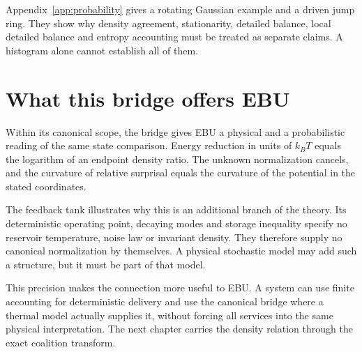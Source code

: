 Appendix~\ref{app:probability} gives a rotating Gaussian example and a driven jump ring. They show why density agreement, stationarity, detailed balance, local detailed balance and entropy accounting must be treated as separate claims. A histogram alone cannot establish all of them.

\section{What this bridge offers EBU}
Within its canonical scope, the bridge gives EBU a physical and a probabilistic reading of the same state comparison. Energy reduction in units of $k_BT$ equals the logarithm of an endpoint density ratio. The unknown normalization cancels, and the curvature of relative surprisal equals the curvature of the potential in the stated coordinates.

The feedback tank illustrates why this is an additional branch of the theory. Its deterministic operating point, decaying modes and storage inequality specify no reservoir temperature, noise law or invariant density. They therefore supply no canonical normalization by themselves. A physical stochastic model may add such a structure, but it must be part of that model.

This precision makes the connection more useful to EBU. A system can use finite accounting for deterministic delivery and use the canonical bridge where a thermal model actually supplies it, without forcing all services into the same physical interpretation. The next chapter carries the density relation through the exact coalition transform.
